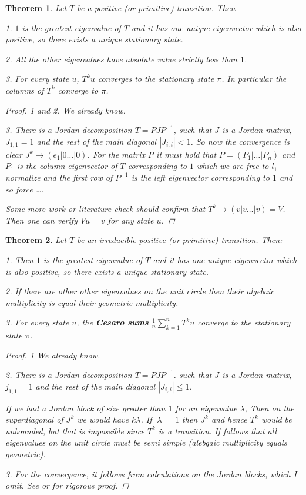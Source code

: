 \documentclass[a4paper,10pt]{article}
\theoremstyle{definition}
\theoremstyle{remark}
\theoremstyle{plain}
\newtheorem{thm}{Theorem}[section]
\begin{document}
\begin{thm}
\label{thm:transition_ev}
Let $T$ be a positive (or primitive) transition. Then 

1. $1$ is the greatest eigenvalue
of $T$ and it has one unique eigenvector which is also positive,
so there exists a unique stationary state.

2. All the other eigenvalues have absolute value strictly less than $1$.

3. For every state $u$, $T^ku$ converges to the stationary state $\pi$.
In particular the columns of $T^k$ converge to $\pi$.

\begin{proof}
1 and 2. We already know.

3. There is a Jordan decomposition $T = PJP^{-1}$, such that $J$ is a Jordan
matrix, $J_{1,1} = 1$ and the rest of the main diagonal $|J_{i,i}| <1$.
So now the convergence is clear $J^k \to (e_1 | 0 \dots | 0)$.
For the matrix $P$ it must hold that $P = (P_1| \dots| P_n)$ and $P_1$ is the column 
eigenvector of $T$ corresponding to $1$ which we are free to $l_1$ normalize 
and the first row of $P^{-1}$ is the
left eigenvector corresponding to $1$ and so force \dots.

Some more work or literature check should confirm that $T^k \to (v|v\dots|v) = V$.
Then one can verify $Vu = v$ for any state $u$.
\end{proof}
\end{thm}

\begin{thm}
\label{thm:transition_irr_ev}
Let $T$ be an irreducible positive (or primitive) transition. 
Then:

1. Then $1$ is the greatest eigenvalue
of $T$ and it has one unique eigenvector which is also positive,
so there exists a unique stationary state.

2. If there are other other eigenvalues on the unit circle then their algebaic
multiplicity is equal their geometric multiplicity.

3. For every state $u$, the \textbf{Cesaro sums} 
$\frac{1}{n}\sum_{k=1}^n T^ku$ converge to the stationary state $\pi$.

\begin{proof}
1 We already know.

2. There is a Jordan decomposition $T = PJP^{-1}$. such that $J$ is a Jordan
matrix, $j_{1,1} = 1$ and the rest of the main diagonal $|J_{i,i}| \leq 1$.

If we had a Jordan block of size greater than $1$ for an eigenvalue $\lambda$,
Then on the superdiagonal of $J^k$ we would have $k \lambda$. If $|\lambda| =1$
then $J^k$ and hence $T^k$ would be unbounded, but that is impossible since
$T^k$ is a transition. If follows that all eigenvalues on the unit circle must
be semi simple (alebgaic multiplicity equals geometric).

3. For the convergence, it follows from calculations on the Jordan blocks, which
I omit. See \textcite{meyer2000matrix} or \textcite{serre2010matrices}
for rigorous proof.
\end{proof}
\end{thm}
\end{document}

